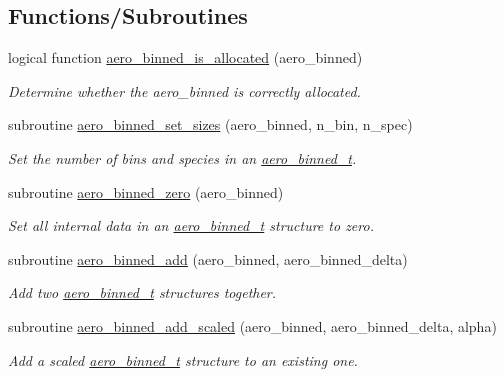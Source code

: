 \subsection*{Functions/\+Subroutines}
\begin{DoxyCompactItemize}
\item 
logical function \mbox{\hyperlink{namespacepmc__aero__binned_a3be8e75668295f81d711fb9e9c6e714b}{aero\+\_\+binned\+\_\+is\+\_\+allocated}} (aero\+\_\+binned)
\begin{DoxyCompactList}\small\item\em Determine whether the {\ttfamily aero\+\_\+binned} is correctly allocated. \end{DoxyCompactList}\item 
subroutine \mbox{\hyperlink{namespacepmc__aero__binned_a4ab330417b0d2db451b2965594f482ca}{aero\+\_\+binned\+\_\+set\+\_\+sizes}} (aero\+\_\+binned, n\+\_\+bin, n\+\_\+spec)
\begin{DoxyCompactList}\small\item\em Set the number of bins and species in an \mbox{\hyperlink{structpmc__aero__binned_1_1aero__binned__t}{aero\+\_\+binned\+\_\+t}}. \end{DoxyCompactList}\item 
subroutine \mbox{\hyperlink{namespacepmc__aero__binned_ab4a6f57e509928736c3e842154a04d76}{aero\+\_\+binned\+\_\+zero}} (aero\+\_\+binned)
\begin{DoxyCompactList}\small\item\em Set all internal data in an \mbox{\hyperlink{structpmc__aero__binned_1_1aero__binned__t}{aero\+\_\+binned\+\_\+t}} structure to zero. \end{DoxyCompactList}\item 
subroutine \mbox{\hyperlink{namespacepmc__aero__binned_a92f2ca0fca2bf061795d607f304fc5f6}{aero\+\_\+binned\+\_\+add}} (aero\+\_\+binned, aero\+\_\+binned\+\_\+delta)
\begin{DoxyCompactList}\small\item\em Add two \mbox{\hyperlink{structpmc__aero__binned_1_1aero__binned__t}{aero\+\_\+binned\+\_\+t}} structures together. \end{DoxyCompactList}\item 
subroutine \mbox{\hyperlink{namespacepmc__aero__binned_a96f6e3d8db17406af7c7a5594544821b}{aero\+\_\+binned\+\_\+add\+\_\+scaled}} (aero\+\_\+binned, aero\+\_\+binned\+\_\+delta, alpha)
\begin{DoxyCompactList}\small\item\em Add a scaled {\ttfamily \mbox{\hyperlink{structpmc__aero__binned_1_1aero__binned__t}{aero\+\_\+binned\+\_\+t}}} structure to an existing one. \end{DoxyCompactList}\item 

\end{DoxyCompactItemize}
